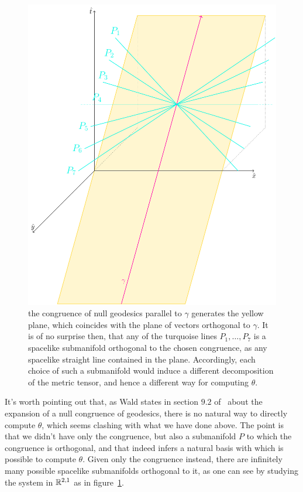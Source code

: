 \begin{figure}
	\caption[]{the congruence of null geodesics parallel to \(\gamma\) generates the yellow plane, which coincides with the plane of vectors orthogonal to \(\gamma\). It is of no surprise then, that any of the turquoise lines \(P_1, \ldots, P_7\) is a spacelike submanifold orthogonal to the chosen congruence, as any spacelike straight line contained in the plane. Accordingly, each choice of such a submanifold would induce a different decomposition of the metric tensor, and hence a different way for computing \(\theta\).}
	\label{fig:expansion-computation}
	\centering
	\includegraphics[scale=0.55]{Immagini/expansion-computation/expansion-computation.pdf}
\end{figure}

\begin{remark}
	It's worth pointing out that, as Wald states in section \(9.2\) of~\cite{wald2010general} about the expansion of a null congruence of geodesics, there is no natural way to directly compute \(\theta\), which seems clashing with what we have done above. The point is that we didn't have only the congruence, but also a submanifold \(P\) to which the congruence is orthogonal, and that indeed infers a natural basis with which is possible to compute \(\theta\). Given only the congruence instead, there are infinitely many possible spacelike submanifolds orthogonal to it, as one can see by studying the system in \({\mathbb{R}}^{2,1}\) as in figure~\ref{fig:expansion-computation}.
\end{remark}


